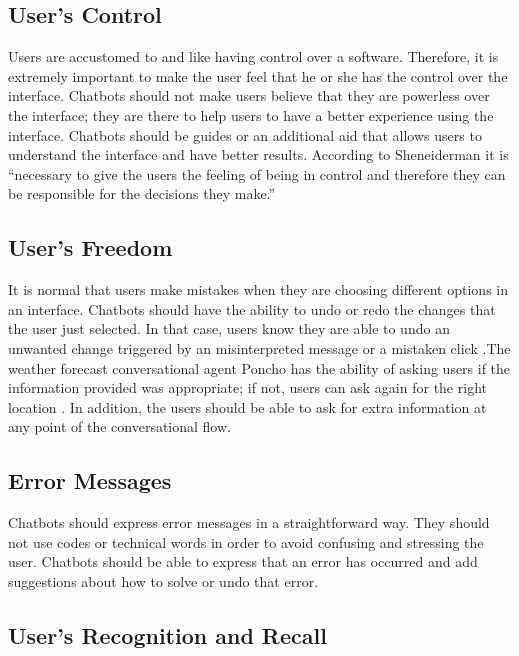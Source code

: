\documentclass[a4paper,10pt]{article}
\begin{document}
\subsection*{User's Control}

Users are accustomed to and like having control over a software. Therefore, it is extremely important to make the user feel that he or she has the control over the interface. Chatbots should not make users believe that they are powerless over the interface; they are there to help users to have a better experience using the interface. Chatbots should be guides or an additional aid that allows users to understand the interface and have better results. According to Sheneiderman \cite{shneiderman1997direct} it is ``necessary to give the users the feeling of being in control and therefore they can be responsible for the decisions they make.” 

\subsection*{User's Freedom}

It is normal that users make mistakes when they are choosing different options in an interface. Chatbots should have the ability to undo or redo the changes that the user just selected. In that case, users know they are able to undo an unwanted change triggered by an misinterpreted message or a mistaken click \cite{HeuristicsWebPage}.The weather forecast conversational agent Poncho has the ability of asking users if the information provided was appropriate; if not, users can ask again for the right location \cite{poncho2017}. In addition, the users should be able to ask for extra information at any point of the conversational flow.


\subsection*{Error Messages}

Chatbots should express error messages in a straightforward way. They should not use codes or technical words in order to avoid confusing and stressing the user. Chatbots should be able to express that an error has occurred and add suggestions about how to solve or undo that error.  

\subsection*{User's Recognition and Recall}
\end{document}
